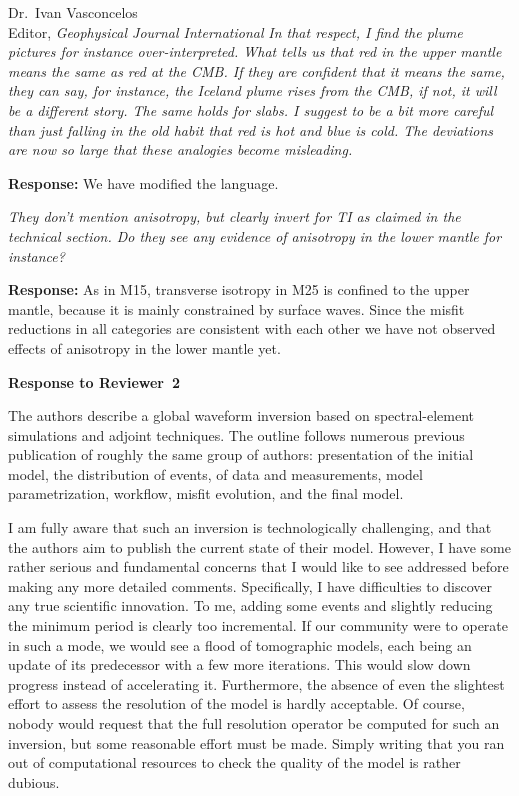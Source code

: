 \documentclass[11pt,a4paper]{letter}
\newcommand{\response}[1]{\textbf{Response:} #1}
\newcommand{\rev}[1]{{\it{#1}}}
\begin{document}
\begin{letter}{Dr.~Ivan Vasconcelos\\
Editor, \textit{Geophysical Journal International}}
\rev{In that respect, I find the plume pictures for instance over-interpreted. What tells us that red in the upper mantle means the same as red at the CMB.
If they are confident that it means the same, they can say, for instance, the Iceland plume rises from the CMB, if not, it will be a different story.
The same holds for slabs. I suggest to be a bit more careful than just falling in the old habit that red is hot and blue is cold. The deviations are now so large that these analogies become misleading.
}

\response{We have modified the language.}

\rev{They don't mention anisotropy, but clearly invert for TI as claimed in the technical section. Do they see any evidence of anisotropy in the lower mantle for instance?
}

\response{As in M15, transverse isotropy in M25 is confined to the upper mantle, because it is mainly constrained by surface waves. Since the misfit reductions in all categories are consistent with each other we have not observed effects of anisotropy in the lower mantle yet.}

{\textbf{\large{Response to Reviewer~2}}}

\rev{The authors describe a global waveform inversion based on spectral-element simulations and adjoint techniques. The outline follows numerous previous publication of roughly the same group of authors: presentation of the initial model, the distribution of events, of data and measurements, model parametrization, workflow, misfit evolution, and the final model. 

I am fully aware that such an inversion is technologically challenging, and that the authors aim to publish the current state of their model. However, I have some rather serious and fundamental concerns that I would like to see addressed before making any more detailed comments. Specifically, I have difficulties to discover any true scientific innovation. To me, adding some events and slightly reducing the minimum period is clearly too incremental. If our community were to operate in such a mode, we would see a flood of tomographic models, each being an update of its predecessor with a few more iterations. This would slow down progress instead of accelerating it. Furthermore, the absence of even the slightest effort to assess the resolution of the model is hardly acceptable. Of course, nobody would request that the full resolution operator be computed for such an inversion, but some reasonable effort must be made. Simply writing that you ran out of computational resources to check the quality of the model is rather dubious.

}
\end{letter}
\end{document}
